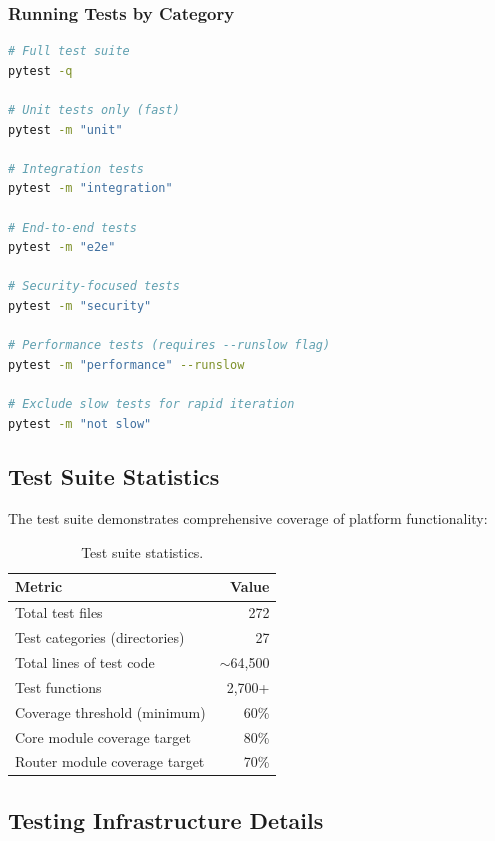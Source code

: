 \subsubsection{Running Tests by Category}

\begin{lstlisting}[language=bash, caption={Test execution commands by category.}]
# Full test suite
pytest -q

# Unit tests only (fast)
pytest -m "unit"

# Integration tests
pytest -m "integration"

# End-to-end tests
pytest -m "e2e"

# Security-focused tests
pytest -m "security"

# Performance tests (requires --runslow flag)
pytest -m "performance" --runslow

# Exclude slow tests for rapid iteration
pytest -m "not slow"
\end{lstlisting}

\subsection{Test Suite Statistics}

The test suite demonstrates comprehensive coverage of platform functionality:

\begin{table}[ht]
\centering
\caption{Test suite statistics.}
\label{tab:test-stats}
\small
\begin{tabular}{lr}
\hline
\textbf{Metric} & \textbf{Value} \\
\hline
Total test files & 272 \\
Test categories (directories) & 27 \\
Total lines of test code & $\sim$64,500 \\
Test functions & 2,700+ \\
Coverage threshold (minimum) & 60\% \\
Core module coverage target & 80\% \\
Router module coverage target & 70\% \\
\hline
\end{tabular}
\end{table}

\subsection{Testing Infrastructure Details}
\label{subsec:testing-infrastructure}

